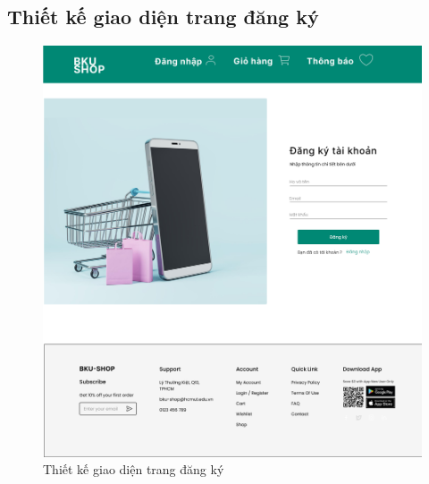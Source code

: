 \subsection {Thiết kế giao diện trang đăng ký}
\begin{figure}[H]
    \begin{center}
    \includegraphics[scale=0.3]{images/hieu/chap-4/signup.jpg}
    \vspace*{5mm}
    \caption{Thiết kế giao diện trang đăng ký}
    \end{center}
\end{figure}
